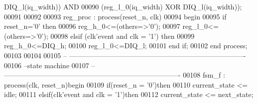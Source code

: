 \begin{DoxyCode}
{      DIQ_l}\textcolor{vhdlchar}{(}\textcolor{vhdlchar}{iq_width}\textcolor{vhdlchar}{)}\textcolor{vhdlchar}{)} \textcolor{keywordflow}{AND} 
00090                \textcolor{vhdlchar}{(}\textcolor{vhdlchar}{reg_l_0}\textcolor{vhdlchar}{(}\textcolor{vhdlchar}{iq_width}\textcolor{vhdlchar}{)} \textcolor{keywordflow}{XOR} \textcolor{vhdlchar}{DIQ_l}\textcolor{vhdlchar}{(}\textcolor{vhdlchar}{iq_width}\textcolor{vhdlchar}{)}\textcolor{vhdlchar}{)};
00091             
00092  
00093  reg\_proc : \textcolor{keywordflow}{process}(reset_n, clk)
00094 \textcolor{vhdlkeyword}{    begin}
00095       \textcolor{keywordflow}{if} \textcolor{vhdlchar}{reset_n}\textcolor{vhdlchar}{=}\textcolor{vhdlchar}{'}\textcolor{vhdllogic}{}\textcolor{vhdllogic}{0}\textcolor{vhdlchar}{'} \textcolor{keywordflow}{then}
00096             reg\_h\_0<=(others=>'0');
00097          reg\_l\_0<=(others=>'0');
00098       \textcolor{keywordflow}{elsif} \textcolor{vhdlchar}{(}\textcolor{vhdlchar}{clk}\textcolor{vhdlchar}{'}\textcolor{vhdlkeyword}{event} \textcolor{keywordflow}{and} \textcolor{vhdlchar}{clk} \textcolor{vhdlchar}{=} \textcolor{vhdlchar}{'}\textcolor{vhdllogic}{}\textcolor{vhdllogic}{1}\textcolor{vhdlchar}{'}\textcolor{vhdlchar}{)} \textcolor{keywordflow}{then}
00099             reg\_h\_0<=DIQ\_h; 
00100          reg\_l\_0<=DIQ\_l; 
00101         \textcolor{keywordflow}{end} \textcolor{keywordflow}{if};
00102     \textcolor{keywordflow}{end} \textcolor{keywordflow}{process};
00103     
00104     
00105 \textcolor{keyword}{-- ----------------------------------------------------------------------------}
00106 \textcolor{keyword}{--state machine}
00107 \textcolor{keyword}{-- ----------------------------------------------------------------------------}
00108 fsm\_f : \textcolor{keywordflow}{process}(clk, reset_n)\textcolor{keywordflow}{begin}
00109     \textcolor{keywordflow}{if}\textcolor{vhdlchar}{(}\textcolor{vhdlchar}{reset_n} \textcolor{vhdlchar}{=} \textcolor{vhdlchar}{'}\textcolor{vhdllogic}{}\textcolor{vhdllogic}{0}\textcolor{vhdlchar}{'}\textcolor{vhdlchar}{)}\textcolor{keywordflow}{then}
00110         \textcolor{vhdlchar}{current_state} \textcolor{vhdlchar}{<=} \textcolor{vhdlchar}{idle};
00111     \textcolor{keywordflow}{elsif}\textcolor{vhdlchar}{(}\textcolor{vhdlchar}{clk}\textcolor{vhdlchar}{'}\textcolor{vhdlkeyword}{event} \textcolor{keywordflow}{and} \textcolor{vhdlchar}{clk} \textcolor{vhdlchar}{=} \textcolor{vhdlchar}{'}\textcolor{vhdllogic}{}\textcolor{vhdllogic}{1}\textcolor{vhdlchar}{'}\textcolor{vhdlchar}{)}\textcolor{keywordflow}{then} 
00112         \textcolor{vhdlchar}{current_state} \textcolor{vhdlchar}{<=} \textcolor{vhdlchar}{next_state};

\end{DoxyCode}

